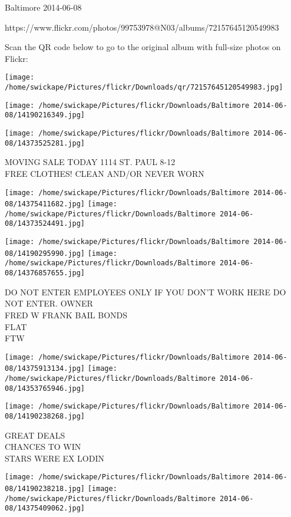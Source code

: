 \documentclass[10pt,letterpaper]{article}
\begin{document}
Baltimore 2014-06-08

https://www.flickr.com/photos/99753978@N03/albums/72157645120549983

Scan the QR code below to go to the original album with full-size photos on Flickr:

\texttt{[image: /home/swickape/Pictures/flickr/Downloads/qr/72157645120549983.jpg]}
\pagebreak

\texttt{[image: /home/swickape/Pictures/flickr/Downloads/Baltimore 2014-06-08/14190216349.jpg]}

\vspace{0.25in}
\texttt{[image: /home/swickape/Pictures/flickr/Downloads/Baltimore 2014-06-08/14373525281.jpg]}

MOVING SALE TODAY 1114 ST. PAUL 8{-}12\\
FREE CLOTHES! CLEAN AND/OR NEVER WORN\\
\pagebreak

\texttt{[image: /home/swickape/Pictures/flickr/Downloads/Baltimore 2014-06-08/14375411682.jpg]}
\texttt{[image: /home/swickape/Pictures/flickr/Downloads/Baltimore 2014-06-08/14373524491.jpg]}

\texttt{[image: /home/swickape/Pictures/flickr/Downloads/Baltimore 2014-06-08/14190295990.jpg]}
\texttt{[image: /home/swickape/Pictures/flickr/Downloads/Baltimore 2014-06-08/14376857655.jpg]}

DO NOT ENTER EMPLOYEES ONLY IF YOU DON'T WORK HERE DO NOT ENTER.  OWNER\\
FRED W FRANK BAIL BONDS\\
FLAT\\
FTW\\
\pagebreak

\texttt{[image: /home/swickape/Pictures/flickr/Downloads/Baltimore 2014-06-08/14375913134.jpg]}
\texttt{[image: /home/swickape/Pictures/flickr/Downloads/Baltimore 2014-06-08/14353765946.jpg]}

\vspace{0.25in}
\texttt{[image: /home/swickape/Pictures/flickr/Downloads/Baltimore 2014-06-08/14190238268.jpg]}

GREAT DEALS\\
CHANCES TO WIN\\
STARS WERE EX LODIN\\
\pagebreak

\texttt{[image: /home/swickape/Pictures/flickr/Downloads/Baltimore 2014-06-08/14190238218.jpg]}
\texttt{[image: /home/swickape/Pictures/flickr/Downloads/Baltimore 2014-06-08/14375409062.jpg]}
\end{document}
